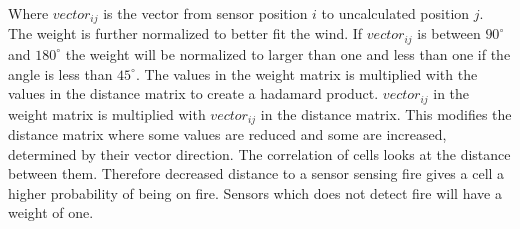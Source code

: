 Where $ vector_{ij} $ is the vector from sensor position $i$ to uncalculated position $j$. The weight is further normalized to better fit the wind. If $ vector_{ij} $ is between $ 90^{\circ} $ and $ 180^{\circ} $ the weight will be normalized to larger than one and less than one if the angle is less than $ 45^{\circ} $. The values in the weight matrix is multiplied with the values in the distance matrix to create a hadamard\cite{hadamard} product. $ vector_{ij} $ in the weight matrix is multiplied with $ vector_{ij} $ in the distance matrix. This modifies the distance matrix where some values are reduced and some are increased, determined by their vector direction. The correlation of cells looks at the distance between them. Therefore decreased distance to a sensor sensing fire gives a cell a higher probability of being on fire. Sensors which does not detect fire will have a weight of one.
